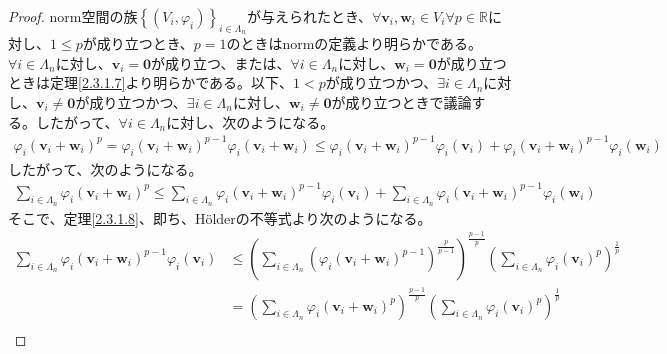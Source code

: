 \documentclass[dvipdfmx]{jsarticle}
\begin{document}
\begin{proof}
norm空間の族$\left\{ \left( V_{i},\varphi_{i} \right) \right\}_{i \in \varLambda_{n}}$が与えられたとき、$\forall\mathbf{v}_{i},\mathbf{w}_{i} \in V_{i}\forall p \in \mathbb{R}$に対し、$1 \leq p$が成り立つとき、$p = 1$のときはnormの定義より明らかである。$\forall i \in \varLambda_{n}$に対し、$\mathbf{v}_{i} = \mathbf{0}$が成り立つ、または、$\forall i \in \varLambda_{n}$に対し、$\mathbf{w}_{i} = \mathbf{0}$が成り立つときは定理\ref{2.3.1.7}より明らかである。以下、$1 < p$が成り立つかつ、$\exists i \in \varLambda_{n}$に対し、$\mathbf{v}_{i} \neq \mathbf{0}$が成り立つかつ、$\exists i \in \varLambda_{n}$に対し、$\mathbf{w}_{i} \neq \mathbf{0}$が成り立つときで議論する。したがって、$\forall i \in \varLambda_{n}$に対し、次のようになる。
\begin{align*}
{\varphi_{i}\left( \mathbf{v}_{i} + \mathbf{w}_{i} \right)}^{p} = {\varphi_{i}\left( \mathbf{v}_{i} + \mathbf{w}_{i} \right)}^{p - 1}\varphi_{i}\left( \mathbf{v}_{i} + \mathbf{w}_{i} \right) \leq {\varphi_{i}\left( \mathbf{v}_{i} + \mathbf{w}_{i} \right)}^{p - 1}\varphi_{i}\left( \mathbf{v}_{i} \right) + {\varphi_{i}\left( \mathbf{v}_{i} + \mathbf{w}_{i} \right)}^{p - 1}\varphi_{i}\left( \mathbf{w}_{i} \right)
\end{align*}
したがって、次のようになる。
\begin{align*}
\sum_{i \in \varLambda_{n}} {\varphi_{i}\left( \mathbf{v}_{i} + \mathbf{w}_{i} \right)}^{p} \leq \sum_{i \in \varLambda_{n}} {{\varphi_{i}\left( \mathbf{v}_{i} + \mathbf{w}_{i} \right)}^{p - 1}\varphi_{i}\left( \mathbf{v}_{i} \right)} + \sum_{i \in \varLambda_{n}} {{\varphi_{i}\left( \mathbf{v}_{i} + \mathbf{w}_{i} \right)}^{p - 1}\varphi_{i}\left( \mathbf{w}_{i} \right)}
\end{align*}
そこで、定理\ref{2.3.1.8}、即ち、Hölderの不等式より次のようになる。
\begin{align*}
\sum_{i \in \varLambda_{n}} {{\varphi_{i}\left( \mathbf{v}_{i} + \mathbf{w}_{i} \right)}^{p - 1}\varphi_{i}\left( \mathbf{v}_{i} \right)} &\leq \left( \sum_{i \in \varLambda_{n}} \left( {\varphi_{i}\left( \mathbf{v}_{i} + \mathbf{w}_{i} \right)}^{p - 1} \right)^{\frac{p}{p - 1}} \right)^{\frac{p - 1}{p}}\left( \sum_{i \in \varLambda_{n}} {\varphi_{i}\left( \mathbf{v}_{i} \right)}^{p} \right)^{\frac{1}{p}}\\
&= \left( \sum_{i \in \varLambda_{n}} {\varphi_{i}\left( \mathbf{v}_{i} + \mathbf{w}_{i} \right)}^{p} \right)^{\frac{p - 1}{p}}\left( \sum_{i \in \varLambda_{n}} {\varphi_{i}\left( \mathbf{v}_{i} \right)}^{p} \right)^{\frac{1}{p}}\\

\end{align*}
\end{proof}
\end{document}

